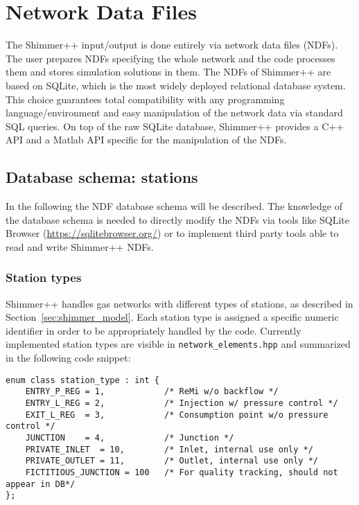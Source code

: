 \section{Network Data Files}
\label{SectionDatabase}
The Shimmer++ input/output is done entirely via network data files (NDFs). The
user prepares NDFs specifying the whole network and the code processes them and
stores simulation solutions in them.
The NDFs of Shimmer++ are based on SQLite, which is the
most widely deployed relational database system. This choice guarantees total
compatibility with any programming language/environment and easy manipulation of
the network data via standard SQL queries. On top of the raw SQLite database, Shimmer++ provides a C++
API and a Matlab API specific for the manipulation of the NDFs.

\subsection{Database schema: stations}
In the following the NDF database schema will be described. The knowledge of
the database schema is needed to directly modify the NDFs via tools like
SQLite Browser (\url{https://sqlitebrowser.org/}) or to implement third party
tools able to read and write Shimmer++ NDFs.

\subsubsection{Station types}
Shimmer++ handles gas networks with different types of stations, as described
in Section~\ref{sec:shimmer_model}. Each station type is assigned a specific
numeric identifier in order to be appropriately handled by the code. Currently
implemented station types are visible in \texttt{network\_elements.hpp} and
summarized in the following code snippet: 

\begin{verbatim}
enum class station_type : int {
    ENTRY_P_REG = 1,            /* ReMi w/o backflow */
    ENTRY_L_REG = 2,            /* Injection w/ pressure control */
    EXIT_L_REG  = 3,            /* Consumption point w/o pressure control */
    JUNCTION    = 4,            /* Junction */
    PRIVATE_INLET  = 10,        /* Inlet, internal use only */
    PRIVATE_OUTLET = 11,        /* Outlet, internal use only */
    FICTITIOUS_JUNCTION = 100   /* For quality tracking, should not appear in DB*/
};
\end{verbatim}

